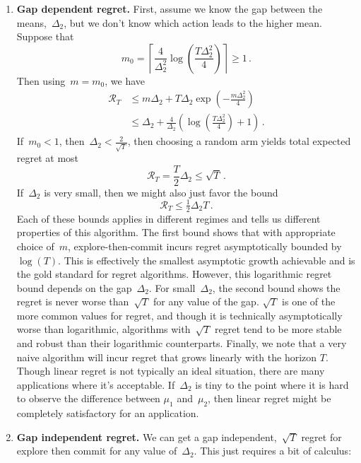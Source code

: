 \documentclass{tufte-book}
\begin{document}
\begin{enumerate}
\def\labelenumi{\arabic{enumi}.}
\item
  \textbf{Gap dependent regret.} First, assume we know the gap between
  the means,~\(\Delta_2\), but we don't know which action leads to the
  higher mean. Suppose that \[
   m_0 = \left\lceil \frac{4}{\Delta_2^2} \log \left(\frac{T \Delta_2^2}{4} \right) \right\rceil \geq 1\,.
  \] Then using~\(m=m_0\), we have \[
  \begin{aligned}
   \mathcal{R}_T &\leq m\Delta_2 + T \Delta_2 \exp\left(-\frac{m\Delta_2^2}{4}\right)\\
   &\leq \Delta_2+ \frac{4}{\Delta_2} \left(\log \left(\frac{T \Delta_2^2}{4}\right)+1\right)\,.
  \end{aligned}
  \] If~\(m_0<1\), then~\(\Delta_2 <\frac{2}{\sqrt{T}}\), then choosing
  a random arm yields total expected regret at most \[
   \mathcal{R}_T = \frac{T}{2} \Delta_2 \leq \sqrt{T}\,.
  \] If~\(\Delta_2\) is very small, then we might also just favor the
  bound \[
   \mathcal{R}_T \leq \tfrac{1}{2}\Delta_2 T\,.
  \] Each of these bounds applies in different regimes and tells us
  different properties of this algorithm. The first bound shows that
  with appropriate choice of~\(m\), explore-then-commit incurs regret
  asymptotically bounded by~\(\log(T)\). This is effectively the
  smallest asymptotic growth achievable and is the gold standard for
  regret algorithms. However, this logarithmic regret bound depends on
  the gap~\(\Delta_2\). For small~\(\Delta_2\), the second bound shows
  the regret is never worse than~\(\sqrt{T}\) for any value of the gap.
  \(\sqrt{T}\) is one of the more common values for regret, and though
  it is technically asymptotically worse than logarithmic, algorithms
  with~\(\sqrt{T}\) regret tend to be more stable and robust than their
  logarithmic counterparts. Finally, we note that a very naive algorithm
  will incur regret that grows linearly with the horizon \(T\). Though
  linear regret is not typically an ideal situation, there are many
  applications where it's acceptable. If~\(\Delta_2\) is tiny to the
  point where it is hard to observe the difference between \(\mu_1\)
  and~\(\mu_2\), then linear regret might be completely satisfactory for
  an application.
\item
  \textbf{Gap independent regret.} We can get a gap
  independent,~\(\sqrt{T}\) regret for explore then commit for any value
  of~\(\Delta_2\). This just requires a bit of calculus: \[
  \begin{aligned}

\end{aligned}\]
\end{enumerate}
\end{document}
